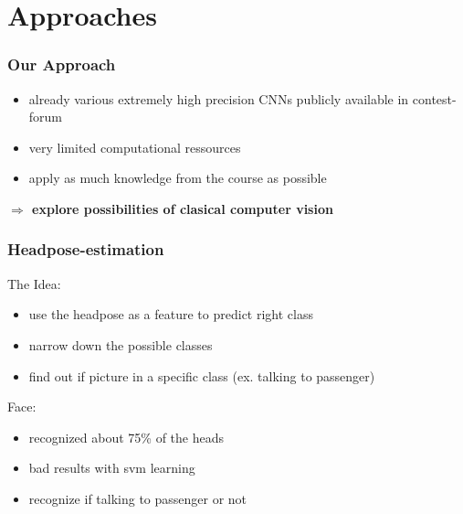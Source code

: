 \documentclass{beamer}
\begin{document}
	\section{Approaches}

    \begin{frame}
        \frametitle{Our Approach}
        \begin{itemize}
            \item already various extremely high precision CNNs publicly available in contest-forum
            \item very limited computational ressources
            \item apply as much knowledge from the course as possible
        \end{itemize}
        \vspace{1cm}
        \begin{centering}
           \Large \textbf{$\Rightarrow$ explore possibilities of clasical computer vision}
        \end{centering}
        
    \end{frame}

	\begin{frame}
		\frametitle{Headpose-estimation}
		The Idea:
		\begin{itemize}
			\item use the headpose as a feature to predict right class
			\item narrow down the possible classes
			\item find out if picture in a specific class (ex. talking to passenger)
		\end{itemize}
		Face:
		\begin{itemize}
			\item recognized about 75\% of the heads
			\item bad results with svm learning
			\item recognize if talking to passenger or not
		\end{itemize}
	\end{frame}
	
\end{document}
